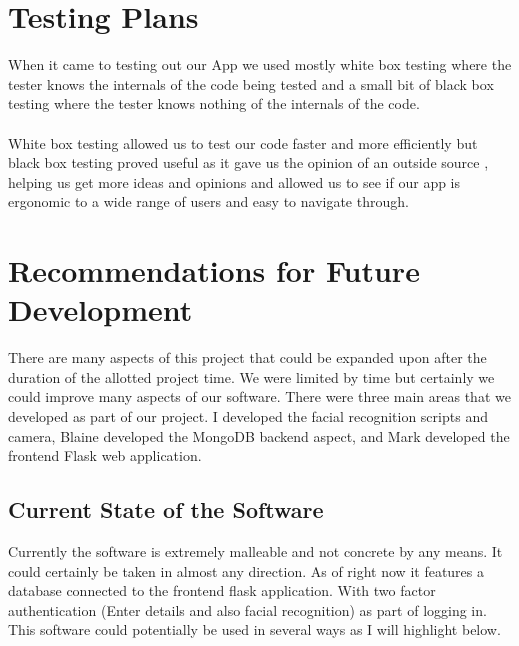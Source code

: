 \documentclass{article}
\begin{document}
\newpage

\section{Testing Plans}

When it came to testing out our App we used mostly white box testing where the tester knows the internals of the code being tested and a small bit of black box testing where the tester knows nothing of the internals of the code.
\\
\\
White box testing allowed us to test our code faster and more efficiently but black box testing proved useful as it gave us the opinion of an outside source  , helping us get more ideas and opinions and allowed us to see if our app is ergonomic to a wide range of users and easy to navigate through.

\newpage

\section{Recommendations for Future Development}
There are many aspects of this project that could be expanded upon after the duration of the allotted project time. We were limited by time but certainly we could improve many aspects of our software. There were three main areas that we developed as part of our project. I developed the facial recognition scripts and camera, Blaine developed the \cite{mongodb}MongoDB backend aspect, and Mark developed the frontend Flask web
application.
\\
\subsection{Current State of the Software}
Currently the software is extremely malleable and not concrete by any means. It could certainly be taken in almost any direction. As of right now it features a database connected to the frontend flask application. With two factor authentication (Enter details and also facial recognition) as part of logging in. This software could potentially be used in several ways as I will highlight below.
\end{document}
